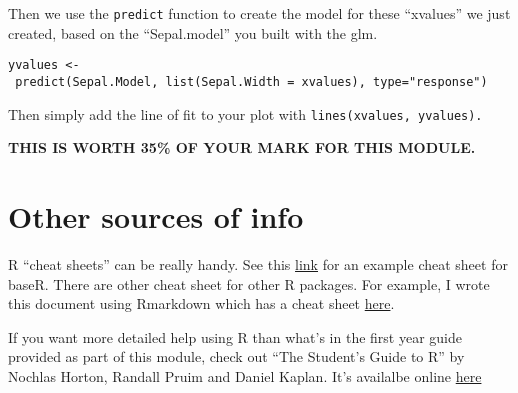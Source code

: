 \documentclass[]{book}
\begin{document}
Then we use the \texttt{predict} function to create the model for these ``xvalues'' we just created, based on the ``Sepal.model'' you built with the glm.

\texttt{yvalues\ \textless{}-\ predict(Sepal.Model,\ list(Sepal.Width\ =\ xvalues),\ type="response")}

Then simply add the line of fit to your plot with \texttt{lines(xvalues,\ yvalues).}

\textbf{THIS IS WORTH 35\% OF YOUR MARK FOR THIS MODULE.}

\hypertarget{other-sources-of-info}{%
\chapter{Other sources of info}\label{other-sources-of-info}}

R ``cheat sheets'' can be really handy. See this \href{https://rstudio.com/wp-content/uploads/2016/05/base-r.pdf}{link} for an example cheat sheet for baseR. There are other cheat sheet for other R packages. For example, I wrote this document using Rmarkdown which has a cheat sheet \href{https://rstudio.com/wp-content/uploads/2015/02/rmarkdown-cheatsheet.pdf}{here}.

If you want more detailed help using R than what's in the first year guide provided as part of this module, check out ``The Student's Guide to R'' by Nochlas Horton, Randall Pruim and Daniel Kaplan. It's availalbe online \href{https://cran.r-project.org/doc/contrib/Horton+Pruim+Kaplan_MOSAIC-StudentGuide.pdf}{here}


\end{document}
